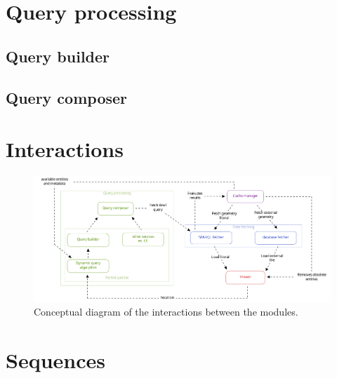 \section{Query processing}

\subsection{Query builder}

\subsection{Query composer}

\section{Interactions} \label{sec:interactions}

\begin{figure}[H]
  \centering
  \includegraphics[width=\textwidth]{figures/pdf/interactions_concept.pdf}
  \caption[Interactions modular framework]{Conceptual diagram of the interactions between the modules.}
  \label{fig:interactionModules}
\end{figure}

\section{Sequences}

